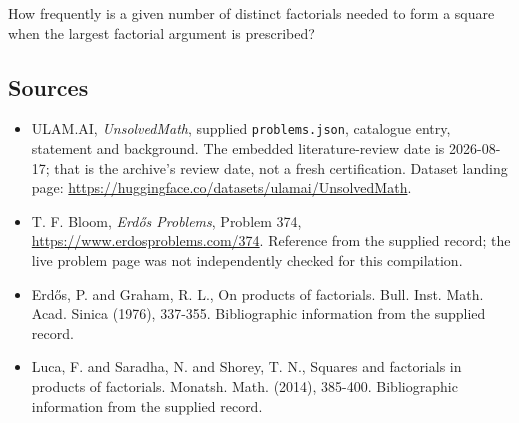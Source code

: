 \documentclass[11pt,a4paper]{article}
\begin{document}
How frequently is a given number of distinct factorials needed to form a square when the largest factorial argument is prescribed?

\subsection{Sources}

{\small

\begin{itemize}

\item[\hypertarget{source:statement:1}{S1}] ULAM.AI, \emph{UnsolvedMath}, supplied \texttt{problems.json}, catalogue entry, statement and background. The embedded literature-review date is 2026-08-17; that is the archive’s review date, not a fresh certification. Dataset landing page: \url{https://huggingface.co/datasets/ulamai/UnsolvedMath}.

\item[\hypertarget{source:statement:2}{S2}] T. F. Bloom, \emph{Erdős Problems}, Problem 374, \url{https://www.erdosproblems.com/374}. Reference from the supplied record; the live problem page was not independently checked for this compilation.

\item[\hypertarget{source:statement:3}{S3}] Erd\H{o}s, P. and Graham, R. L., On products of factorials. Bull. Inst. Math. Acad. Sinica (1976), 337-355. Bibliographic information from the supplied record.

\item[\hypertarget{source:statement:4}{S4}] Luca, F. and Saradha, N. and Shorey, T. N., Squares and factorials in products of factorials. Monatsh. Math. (2014), 385-400. Bibliographic information from the supplied record.

\end{itemize}

}

\label{end:statement}
\end{document}
